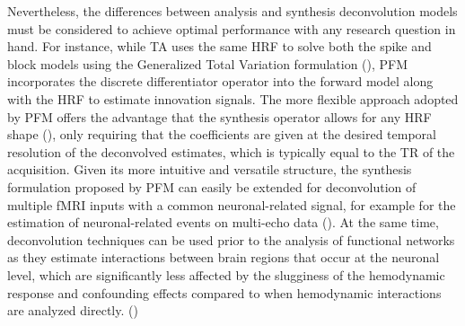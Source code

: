 Nevertheless, the differences between analysis and synthesis deconvolution models must be considered to achieve optimal performance with any research question in hand. For instance, while TA uses the same HRF to solve both the spike and block models using the Generalized Total Variation formulation (\citealt{Karahanoglu2011SignalProcessingApproach}), PFM incorporates the discrete differentiator operator into the forward model along with the HRF to estimate innovation signals. The more flexible approach adopted by PFM offers the advantage that the synthesis operator allows for any HRF shape (\citealt{Elad2007Analysisversussynthesis}), only requiring that the coefficients are given at the desired temporal resolution of the deconvolved estimates, which is typically equal to the TR of the acquisition. Given its more intuitive and versatile structure, the synthesis formulation proposed by PFM can easily be extended for deconvolution of multiple fMRI inputs with a common neuronal-related signal, for example for the estimation of neuronal-related events on multi-echo data (\citealt{CaballeroGaudes2019deconvolutionalgorithmmulti}).
At the same time, deconvolution techniques can be used prior to the analysis of functional networks as they estimate interactions between brain regions that occur at the neuronal level, which are significantly less affected by the slugginess of the hemodynamic response and confounding effects compared to when hemodynamic interactions are analyzed directly. (\citealt{Gitelman2003Modelingregionalpsychophysiologic}) 

